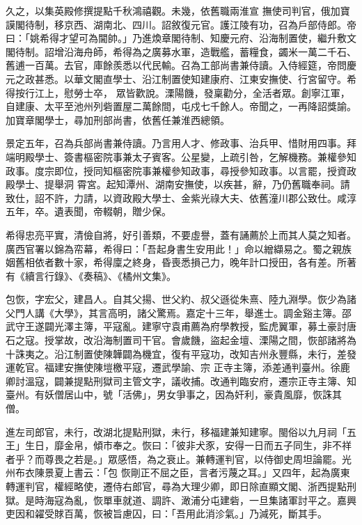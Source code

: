\begin{pinyinscope}
 久之，以集英殿修撰提點千秋鴻禧觀。未幾，依舊職兩淮宣
 撫使司判官，俄加寶謨閣待制，移京西、湖南北、四川。詔敘復元官。護江陵有功，召為戶部侍郎。帝曰：「姚希得才望可為閫帥。」乃進煥章閣待制、知慶元府、沿海制置使，繼升敷文閣待制。詔增沿海舟師，希得為之廣募水軍，造戰艦，蓄糧食，蠲米一萬二千石、舊逋一百萬。去官，庫餘羨悉以代民輸。召為工部尚書兼侍讀。入侍經筵，帝問慶元之政甚悉。以華文閣直學士、沿江制置使知建康府、江東安撫使、行宮留守。希得按行江上，慰勞士卒，
 眾皆歡說。溧陽饑，發稟勸分，全活者眾。創寧江軍，自建康、太平至池州列砦置屋二萬餘間，屯戍七千餘人。帝聞之，一再降詔獎諭。加寶章閣學士，尋加刑部尚書，依舊任兼淮西總領。



 景定五年，召為兵部尚書兼侍讀。乃言用人才、修政事、治兵甲、惜財用四事。拜端明殿學士、簽書樞密院事兼太子賓客。公星變，上疏引咎，乞解機務。兼權參知政事。度宗即位，授同知樞密院事兼權參知政事，尋授參知政事。以言罷，授資政殿學士、提舉洞
 霄宮。起知潭州、湖南安撫使，以疾甚，辭，乃仍舊職奉祠。請致仕，詔不許，力請，以資政殿大學士、金紫光祿大夫、依舊潼川郡公致仕。咸淳五年，卒。遺表聞，帝輟朝，贈少保。



 希得忠亮平實，清儉自將，好引善類，不要虛譽，蓋有誦薦於上而其人莫之知者。廣西官署以錦為帟幕，希得曰：「吾起身書生安用此！」命以繒纈易之。蜀之親族姻舊相依者數十家，希得廩之終身，昏喪悉損己力，晚年計口授田，各有差。所著有《續言行錄》、《奏稿》、《橘州文集》。



 包恢，字宏父，建昌人。自其父揚、世父約、叔父遜從朱熹、陸九淵學。恢少為諸父門人講《大學》，其言高明，諸父驚焉。嘉定十三年，舉進士。調金谿主簿。邵武守王遂闢光澤主簿，平寇亂。建寧守袁甫薦為府學教授，監虎翼軍，募土豪討唐石之寇。授掌故，改沿海制置司干官。會歲饑，盜起金壇、溧陽之間，恢部諸將為十誅夷之。沿江制置使陳韡闢為機宜，復有平寇功，改知吉州永豐縣，未行，差發運乾官。福建安撫使陳塏檄平寇，遷武學諭、宗
 正寺主簿，添差通判臺州。徐鹿卿討溫寇，闢兼提點刑獄司主管文字，議收捕。改通判臨安府，遷宗正寺主簿、知臺州。有妖僧居山中，號「活佛」，男女爭事之，因為奸利，豪貴風靡，恢誅其僧。



 進左司郎官，未行，改湖北提點刑獄，未行，移福建兼知建寧。閩俗以九月祠「五王」生日，靡金帛，傾市奉之。恢曰：「彼非犬豕，安得一日而五子同生，非不祥者乎？而尊畏之若是。」眾感悟，為之衰止。兼轉運判官，以侍御史周坦論罷。光州布衣陳景夏上書云：「包
 恢剛正不屈之臣，言者污蔑之耳。」又四年，起為廣東轉運判官，權經略使，遷侍右郎官，尋為大理少卿，即日除直顯文閣、浙西提點刑獄。是時海寇為亂，恢單車就道、調許、澉浦分屯建砦，一旦集諸軍討平之。嘉興吏因和糴受賕百萬，恢被旨慮囚，曰：「吾用此消沴氣。」乃減死，斷其手。




\end{pinyinscope}
